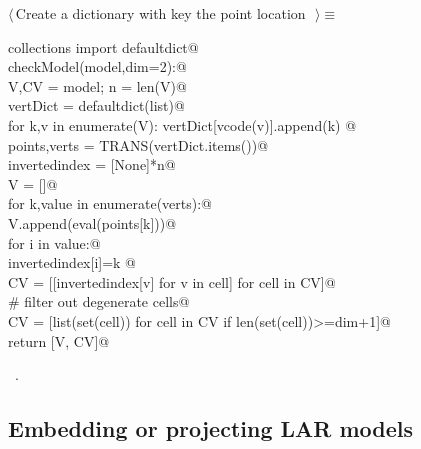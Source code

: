 \documentclass[11pt,oneside]{article}	%
\begin{document}
\begin{flushleft} \small \label{scrap4}
$\langle\,$Create a dictionary with key the point location\nobreak\ {\footnotesize {}}$\,\rangle\equiv$
\vspace{-1ex}
\begin{list}{}{} \item
\mbox{}\verb@from collections import defaultdict@\\
\mbox{}\verb@def checkModel(model,dim=2):@\\
\mbox{}\verb@   V,CV = model; n = len(V)@\\
\mbox{}\verb@   vertDict = defaultdict(list)@\\
\mbox{}\verb@   for k,v in enumerate(V): vertDict[vcode(v)].append(k) @\\
\mbox{}\verb@   points,verts = TRANS(vertDict.items())@\\
\mbox{}\verb@   invertedindex = [None]*n@\\
\mbox{}\verb@   V = []@\\
\mbox{}\verb@   for k,value in enumerate(verts):@\\
\mbox{}\verb@      V.append(eval(points[k]))@\\
\mbox{}\verb@      for i in value:@\\
\mbox{}\verb@         invertedindex[i]=k   @\\
\mbox{}\verb@   CV = [[invertedindex[v] for v in cell] for cell in CV]@\\
\mbox{}\verb@   # filter out degenerate cells@\\
\mbox{}\verb@   CV = [list(set(cell)) for cell in CV if len(set(cell))>=dim+1]@\\
\mbox{}\verb@   return [V, CV]@\\
\mbox{}\verb@@{\NWsep}
\end{list}
\vspace{-1ex}
\footnotesize\addtolength{\baselineskip}{-1ex}
\begin{list}{}{\setlength{\itemsep}{-\parsep}\setlength{\itemindent}{-\leftmargin}}
\item \NWtxtMacroRefIn\ .
\end{list}
\end{flushleft}

\subsection{Embedding or projecting LAR models}
\end{document}

